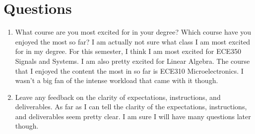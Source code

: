 \documentclass{article}
\begin{document}
\section{Questions}
\begin{enumerate}
\item What course are you most excited for in your degree? Which course have you enjoyed the most so far?
\newline I am actually not sure what class I am most excited for in my degree. For this semester, I think I am most excited for ECE350 Signals and Systems. I am also pretty excited for Linear Algebra. The course that I enjoyed the content the most in so far is ECE310 Microelectronics. I wasn't a big fan of the intense workload that came with it though.
\item Leave any feedback on the clarity of expectations, instructions, and deliverables.
\newline As far as I can tell the clarity of the expectations, instructions, and deliverables seem pretty clear. I am sure I will have many questions later though.
\end{enumerate}
\end{document}
